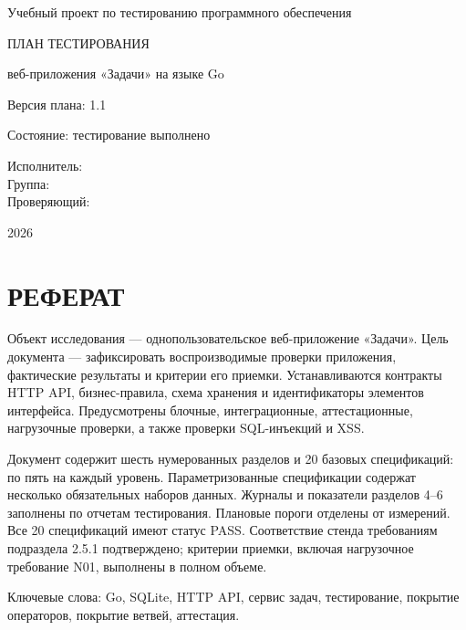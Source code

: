 \documentclass[12pt,a4paper]{extarticle}
\newcommand{\struct}[1]{%
  \clearpage\begingroup
  \titlespacing*{\section}{0pt}{0pt}{18pt}%
  \section*{\centering #1}\endgroup%
  \addcontentsline{toc}{section}{#1}}
\begin{document}
\hypersetup{pageanchor=false}
\begin{titlepage}
\centering
Учебный проект по тестированию программного обеспечения\par
\vfill
ПЛАН ТЕСТИРОВАНИЯ\par
веб-приложения «Задачи» на языке Go\par
\vspace{1cm}
Версия плана: 1.1\par
Состояние: тестирование выполнено\par
\vfill
\begin{flushright}
Исполнитель: \underline{\hspace{5cm}}\\[6pt]
Группа: \underline{\hspace{5cm}}\\[6pt]
Проверяющий: \underline{\hspace{5cm}}
\end{flushright}
\vfill
\underline{\hspace{4cm}}\par
2026
\end{titlepage}
\setcounter{page}{2}
\hypersetup{pageanchor=true}

\struct{РЕФЕРАТ}
Объект исследования --- однопользовательское веб-приложение
«Задачи». Цель документа --- зафиксировать воспроизводимые проверки приложения,
фактические результаты и критерии его приемки. Устанавливаются контракты
HTTP API, бизнес-правила, схема хранения и идентификаторы элементов интерфейса.
Предусмотрены блочные, интеграционные, аттестационные, нагрузочные проверки,
а также проверки SQL-инъекций и XSS.

Документ содержит шесть нумерованных разделов и 20 базовых спецификаций:
по пять на каждый уровень. Параметризованные спецификации содержат несколько
обязательных наборов данных. Журналы и показатели разделов 4--6 заполнены по отчетам тестирования.
Плановые пороги отделены от измерений. Все 20 спецификаций имеют статус PASS.
Соответствие стенда требованиям подраздела 2.5.1 подтверждено;
критерии приемки, включая нагрузочное требование N01, выполнены в полном объеме.

Ключевые слова: Go, SQLite, HTTP API, сервис задач, тестирование,
покрытие операторов, покрытие ветвей, аттестация.

\clearpage
\begingroup
\titleformat{\section}{\normalfont\normalsize\centering}{}{0pt}{}
\titlespacing*{\section}{0pt}{0pt}{18pt}
\tableofcontents
\endgroup
\end{document}

